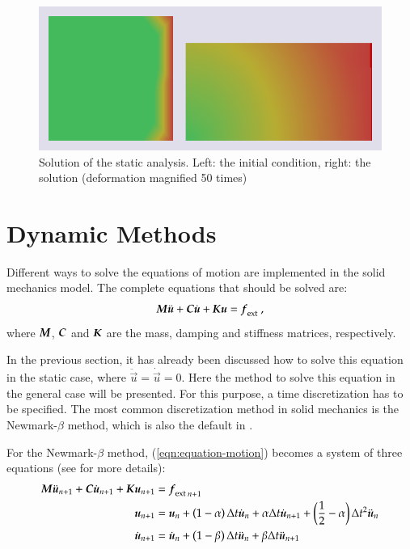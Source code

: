 \begin{figure}[!htb]
  \centering
  \includegraphics[width=.6\linewidth]{figures/static_analysis}
  \caption{Solution of the static analysis. Left: the initial
condition, right: the solution (deformation magnified 50 times)}
  \label{fig:smm:implicit:static_solution}
\end{figure}

\section{Dynamic Methods} \label{sect:smm:Dynamic_methods}

Different ways to solve the equations of motion are implemented in the
solid mechanics model.  The complete equations that should be solved
are:
\begin{equation}
\label{eqn:equation-motion}
\boldsymbol{M}\ddot{\boldsymbol{u}} +
\boldsymbol{C}\dot{\boldsymbol{u}} + \boldsymbol{K}\boldsymbol{u} = \boldsymbol{f}_{{\mathrm{ext}}}~,
\end{equation}
where $\boldsymbol{M}$, $\boldsymbol{C}$ and $\boldsymbol{K}$ are the mass,
damping and stiffness matrices, respectively.

In the previous section, it has already been discussed how to solve
this equation in the static case, where $\ddot{\vec{u}} =
\dot{\vec{u}} = 0$.  Here the method to solve this equation in the
general case will be presented.  For this purpose, a time
discretization has to be specified.  The most common discretization
method in solid mechanics is the Newmark-$\beta$ method, which is
also the default in \akantu.

For the Newmark-$\beta$ method, (\ref{eqn:equation-motion}) becomes a
system of three equations (see \cite{curnier92a} \cite{hughes-83a} for
more details):
\begin{align}
\boldsymbol{M} \ddot{\boldsymbol{u}}_{n+1} + \boldsymbol{C}\dot{\boldsymbol{u}}_{n+1} + \boldsymbol{K} \boldsymbol{u}_{n+1} &={\boldsymbol{f}_{{\mathrm{ext}}}}_{\, n+1}
\label{eqn:equation-motion-discret} \\
\boldsymbol{u}_{n+1} &=\boldsymbol{u}_{n} + \left(1 - \alpha\right) \Delta t \dot{\boldsymbol{u}}_{n} +
\alpha \Delta t \dot{\boldsymbol{u}}_{n+1} + \left(\frac{1}{2} -
\alpha\right) \Delta t^2
\ddot{\boldsymbol{u}}_{n} \label{eqn:finite-difference-1}\\
\dot{\boldsymbol{u}}_{n+1} &= \dot{\boldsymbol{u}}_{n} + \left(1 - \beta\right)
\Delta t \ddot{\boldsymbol{u}}_{n} + \beta \Delta t
\ddot{\boldsymbol{u}}_{n+1} \label{eqn:finite-difference-2}
\end{align}

